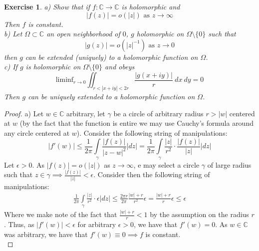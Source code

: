 \documentclass{article}
\newcommand{\bb}[1]{\mathbb{#1}}
\newtheorem{exercise}{Exercise}
\begin{document}
\begin{exercise}
  a) Show that if $f: \bb{C} \to \bb{C}$ is holomorphic and
  \[
    |f(z)| = o(|z|) \text{ as } z \to \infty
  \]
  Then $f$ is constant. \\
  b) Let $\Omega \subset \bb{C}$ an open neighborhood of $0$, $g$ holomorphic on $\Omega \setminus \{0\}$ such that
  \[
    |g(z)| = o(|z|^{-1}) \text{ as } z \to 0
  \]
  then $g$ can be extended (uniquely) to a holomorphic function on $\Omega$. \\
  c) If $g$ is holomorphic on $\Omega \setminus \{0\}$ and obeys
  \[
    \text{liminf}_{r \to 0} \iint_{r < |x+iy| < 2r}\frac{|g(x+iy)|}{r} \ dx\ dy = 0 
  \]
  Then $g$ can be uniquely extended to a holomorphic function on $\Omega$.
\end{exercise}
\begin{proof}
  a) Let $w\in \bb{C}$ arbitrary, let $\gamma$ be a circle of arbitrary radius $r > |w|$ centered at $w$ (by the fact that the function is entire we may use Cauchy's formula around any circle centered at $w$). Consider the following string of manipulations:
  \[
    |f'(w)|\leq \frac{1}{2\pi}\int\limits_{\gamma}\frac{|f(z)|}{|z-w|^{2}}|dz| = \frac{1}{2\pi}\int\limits_{\gamma}\frac{|z|}{r^{2}} \cdot \frac{|f(z)|}{|z|}|dz| 
  \]
  Let $\epsilon > 0$. As $|f(z)| = o(|z|)$ as $z \to \infty$, e may select a circle $\gamma$ of large radius such that $z \in \gamma \implies \frac{|f(z)|}{|z|} < \epsilon$. Consider then the following string of manipulations:
  \begin{align*}
     \frac{1}{2\pi}\int\limits_{\gamma}\frac{|z|}{r^{2}} \cdot \epsilon|dz| \leq \frac{2\pi r}{2\pi} \frac{|w| + r}{r^{2}}\epsilon = \frac{|w| + r}{r} \epsilon \leq \epsilon
  \end{align*}
  Where we make note of the fact that $\frac{|w| + r}{r} < 1$ by the assumption on the radius $r$. Thus, as $|f'(w)|< \epsilon$ for arbitrary $\epsilon> 0$, we have that $f'(w) = 0$. As $w \in \bb{C}$ was arbitrary, we have that $f'(w) \equiv 0 \implies f$ is constant. \\
  

\end{proof}
\end{document}
